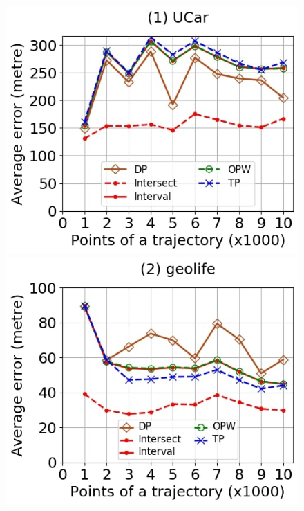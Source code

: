 {\begin{figure}[tb!]
	\centering
	\includegraphics[scale=0.250]{Figures/Exp-where-DAD-error-size-service.jpg}	\hspace{0.5ex}
	\includegraphics[scale=0.250]{Figures/Exp-where-DAD-error-size-geolife.jpg}	\hspace{0.5ex}

\end{figure}}

